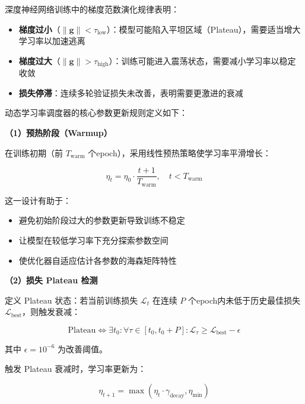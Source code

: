 深度神经网络训练中的梯度范数演化规律表明：

\begin{itemize}
    \item \textbf{梯度过小}（$\|\mathbf{g}\| < \tau_{\text{low}}$）：模型可能陷入平坦区域（Plateau），需要适当增大学习率以加速逃离
    \item \textbf{梯度过大}（$\|\mathbf{g}\| > \tau_{\text{high}}$）：训练可能进入震荡状态，需要减小学习率以稳定收敛
    \item \textbf{损失停滞}：连续多轮验证损失未改善，表明需要更激进的衰减
\end{itemize}


动态学习率调度器的核心参数更新规则定义如下：

\textbf{（1）预热阶段（Warmup）}

在训练初期（前 $T_{\text{warm}}$ 个epoch），采用线性预热策略使学习率平滑增长：

\begin{equation}
\eta_t = \eta_0 \cdot \frac{t + 1}{T_{\text{warm}}}, \quad t < T_{\text{warm}}
\end{equation}

这一设计有助于：
\begin{itemize}
    \item 避免初始阶段过大的参数更新导致训练不稳定
    \item 让模型在较低学习率下充分探索参数空间
    \item 使优化器自适应估计各参数的海森矩阵特性
\end{itemize}

\textbf{（2）损失 Plateau 检测}

定义 Plateau 状态：若当前训练损失 $\mathcal{L}_t$ 在连续 $P$ 个epoch内未低于历史最佳损失 $\mathcal{L}_{\text{best}}$，则触发衰减：

\begin{equation}
\text{Plateau} \iff \exists t_0: \forall \tau \in [t_0, t_0 + P]: \mathcal{L}_\tau \geq \mathcal{L}_{\text{best}} - \epsilon
\end{equation}

其中 $\epsilon = 10^{-6}$ 为改善阈值。

触发 Plateau 衰减时，学习率更新为：

\begin{equation}
\eta_{t+1} = \max\left(\eta_t \cdot \gamma_{\text{decay}}, \eta_{\text{min}}\right)
\end{equation}

